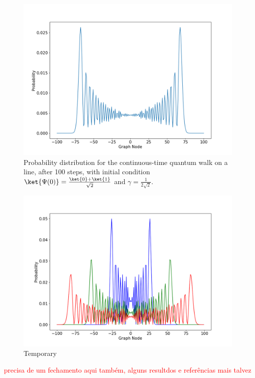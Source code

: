                 \begin{figure}[!h]
                    \centering
                    \includegraphics[scale=0.40]{img/ContQuantumWalk/ctqwSingleSup.png}
                    \caption{Probability distribution for the continuous-time quantum walk on a line, after 100 steps, with initial condition $\ket{\Psi(0)}=\frac{\ket{0}+\ket{1}}{\sqrt{2}}$ and $\gamma=\frac{1}{2\sqrt{2}}$.} 
                    \label{fig:contdist2}
                \end{figure}
                
                \begin{figure}[!h]
                    \centering
                    \includegraphics[scale=0.40]{img/ContQuantumWalk/ctqwMultipleTime.png}
                    \caption{Temporary} 
                    \label{fig:contdist2}
                \end{figure}
                
             \textcolor{red}{precisa de um fechamento aqui também, alguns resultdos e referências mais talvez}
             
                \clearpage
                
